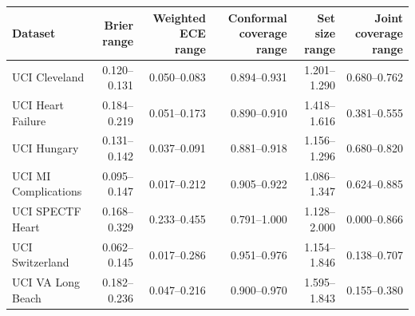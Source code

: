 \begin{tabular}{lrrrrr}
\toprule
Dataset & Brier range & Weighted ECE range & Conformal coverage range & Set size range & Joint coverage range \\
\midrule
UCI Cleveland & 0.120--0.131 & 0.050--0.083 & 0.894--0.931 & 1.201--1.290 & 0.680--0.762 \\
UCI Heart Failure & 0.184--0.219 & 0.051--0.173 & 0.890--0.910 & 1.418--1.616 & 0.381--0.555 \\
UCI Hungary & 0.131--0.142 & 0.037--0.091 & 0.881--0.918 & 1.156--1.296 & 0.680--0.820 \\
UCI MI Complications & 0.095--0.147 & 0.017--0.212 & 0.905--0.922 & 1.086--1.347 & 0.624--0.885 \\
UCI SPECTF Heart & 0.168--0.329 & 0.233--0.455 & 0.791--1.000 & 1.128--2.000 & 0.000--0.866 \\
UCI Switzerland & 0.062--0.145 & 0.017--0.286 & 0.951--0.976 & 1.154--1.846 & 0.138--0.707 \\
UCI VA Long Beach & 0.182--0.236 & 0.047--0.216 & 0.900--0.970 & 1.595--1.843 & 0.155--0.380 \\
\bottomrule
\end{tabular}
